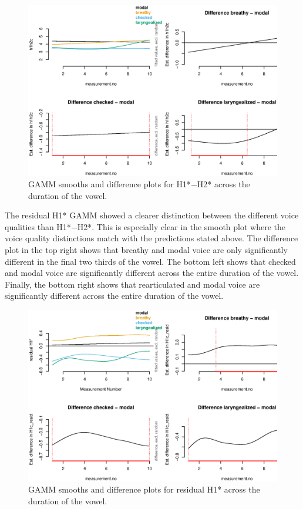 \begin{figure}[h!]
  \centering
  \includegraphics[width = \textwidth]{images/h1h2_gamm.eps}
  \caption{GAMM smooths and difference plots for H1*$-$H2* across the duration of the vowel.}
  \label{fig:GAMM_h1h2}
\end{figure}


The residual H1* GAMM showed a clearer distinction between the different voice qualities than H1*$-$H2*. This is especially clear in the smooth plot where the voice quality distinctions match with the predictions stated above. The difference plot in the top right shows that breathy and modal voice are only significantly different in the final two thirds of the vowel. The bottom left shows that checked and modal voice are significantly different across the entire duration of the vowel. Finally, the bottom right shows that rearticulated and modal voice are significantly different across the entire duration of the vowel.
\begin{figure}[h!]
  \centering
  \includegraphics[width = \textwidth]{images/residH1_gamm.eps}
  \caption{GAMM smooths and difference plots for residual H1* across the duration of the vowel.}
  \label{fig:GAMM_residh1}
\end{figure}

